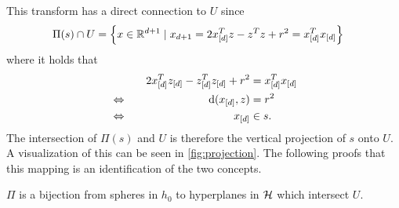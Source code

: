 This transform has a direct connection to $U$ since
\begin{align}
    \Pi(s) \cap U &= \left\{ x \in \mathbb{R}^{d+1} \mid x_{d+1} = 2x_{[d]}^Tz - z^Tz + r^2 = x_{[d]}^Tx_{[d]} \right\}
\end{align}
where it holds that
\begin{alignat}{2}
    &&2x_{[d]}^Tz_{[d]} - z_{[d]}^Tz_{[d]} + r^2 &= x_{[d]}^Tx_{[d]}\\
    &\Leftrightarrow\quad& \operatorname{d}(x_{[d]}, z) &= r^2\\
    &\Leftrightarrow\quad& x_{[d]} &\in s.
\end{alignat}
The intersection of $\Pi(s)$ and $U$ is therefore the vertical projection of $s$ onto $U$.
A visualization of this can be seen in \cref{fig:projection}.
The following proofs that this mapping is an identification of the two concepts.
\begin{lemma}
    \label{lem:pibijection}
    $\Pi$ is a bijection from spheres in $h_0$ to hyperplanes in $\mathcal{H}$ which intersect $U$.
\end{lemma}
